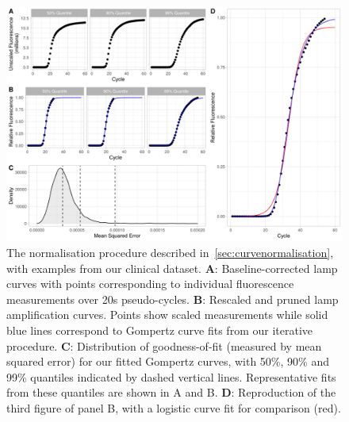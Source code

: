 \documentclass[../thesis.tex]{subfiles}
\begin{document}
\begin{figure}[!tpb] 
\centering
\includegraphics[width=6in]{../figures/chapter2/paper_gomp_quality_fig.png}
\caption{The normalisation procedure described in~\ref{sec:curvenormalisation}, with examples from our clinical dataset. \textbf{A}: Baseline-corrected \gls{lamp} curves with points corresponding to individual fluorescence measurements over 20s pseudo-cycles. \textbf{B}: Rescaled and pruned \gls{lamp} amplification curves. Points show scaled measurements while solid blue lines correspond to Gompertz curve fits from our iterative procedure. \textbf{C}: Distribution of goodness-of-fit (measured by mean squared error) for our fitted Gompertz curves, with 50\%, 90\% and 99\% quantiles indicated by dashed vertical lines. Representative fits from these quantiles are shown in {A} and {B}. \textbf{D}: Reproduction of the third figure of panel {B}, with a logistic curve fit for comparison (red).  \label{fig:gompertz_fit}}
\end{figure}
\end{document}
